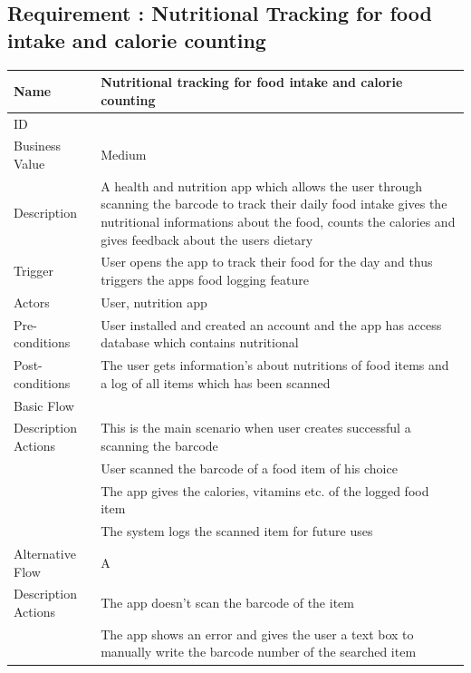 \documentclass{article}
\begin{document}
		\subsection{Requirement : Nutritional Tracking for food intake and calorie counting}
		\begin{center}
			
			\begin{table}[htbp]
			\begin{tabularx}{1.0\textwidth}{|>{\raggedright\arraybackslash}p{}|>{\raggedright\arraybackslash}X|}
				\hline
				Name             & Nutritional tracking for food intake and calorie counting \\ \hline
				ID               & 8 \\ \hline
				Business Value   & Medium \\ \hline
				Description      & A health and nutrition app which allows the user through scanning the barcode
									to track their daily food intake gives the nutritional informations about the food, counts the calories and gives feedback about the 
									users dietary \\ \hline
				Trigger          & User opens the app to track their food for the day and thus triggers the apps food logging feature\\ \hline
				Actors           & User, nutrition app\\ \hline
				Pre-conditions   & User installed and created an account and the app has access database which contains nutritional\\ \hline
				Post-conditions  & The user gets information's about nutritions of food items and a log of all items which has been scanned\\ \hline
				Basic Flow       & \\ \hline
								Description Actions& This is the main scenario when user creates successful a scanning the barcode \\ \hline
								1 & User scanned the barcode of a food item of his choice \\ \hline
								2 & The app gives the calories, vitamins etc. of the logged food item \\ \hline
								3 & The system logs the scanned item for future uses \\ \hline
				Alternative Flow & A \\ \hline
								Description Actions& The app doesn't scan the barcode of the item \\ \hline
								1 & The app shows an error and gives the user a text box to manually write the barcode number of the searched item \\ \hline

\end{tabularx}
\end{table}
\end{center}
\end{document}
